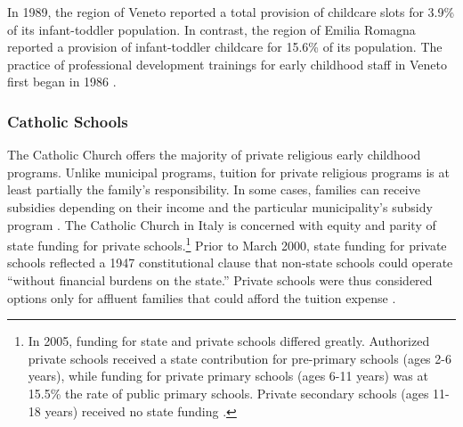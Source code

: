 In 1989, the region of Veneto reported a total provision of childcare slots for 3.9\% of its infant-toddler population. In contrast, the region of Emilia Romagna reported a provision of infant-toddler childcare for 15.6\% of its population. The practice of professional development trainings for early childhood staff in Veneto first began in 1986 \citep{Becchi-Ferrari_1990_Pub-Inf-Centres-Italy}.

\subsubsection{Catholic Schools}
The Catholic Church offers the majority of private religious early childhood programs. Unlike municipal programs, tuition for private religious programs is at least partially the family's responsibility. In some cases, families can receive subsidies depending on their income and the particular municipality's subsidy program \citep{Hohnerlein_2009_Paradox-Public-Preschools}.  The Catholic Church in Italy is concerned with equity and parity of state funding for private schools.\footnote{In 2005, funding for state and private schools differed greatly. Authorized private schools received a state contribution for pre-primary schools (ages 2-6 years), while funding for private primary schools (ages 6-11 years) was at 15.5\% the rate of public primary schools. Private secondary schools (ages 11-18 years) received no state funding \citep{Becchi-Ferrari_1990_Pub-Inf-Centres-Italy}.} Prior to March 2000, state funding for private schools reflected a 1947 constitutional clause that non-state schools could operate ``without financial burdens on the state.'' Private schools were thus considered options only for affluent families that could afford the tuition expense \citep{Hohnerlein_2009_Paradox-Public-Preschools}.
